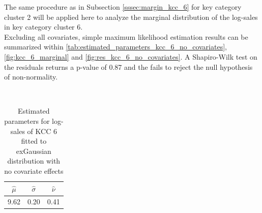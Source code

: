 
The same procedure as in Subsection \ref{sssec:margin_kcc_6} for key category cluster 2 will be applied here to analyze the marginal distribution of the log-sales in key category cluster 6.\\

Excluding all covariates, simple maximum likelihood estimation results can be summarized within \autoref{tab:estimated_parameters_kcc_6_no_covariates}, \autoref{fig:kcc_6_marginal} and \autoref{fig:res_kcc_6_no_covariates}. A Shapiro-Wilk test on the residuals returns a p-value of 0.87 and the fails to reject the null hypothesis of non-normality.
\\



\begin{table}[H]
\setlength\arrayrulewidth{1pt}  
\centering
\begin{adjustbox}{max width=\textwidth}\
\begin{tabular}{|c|c|c|}
\hline
\rowcolor{lightgray} 
$\hat{\mu}$ & $\hat{\sigma}$ & $\hat{\nu}$ \\ \hline
9.62        & 0.20           & 0.41        \\ \hline
\end{tabular}
\end{adjustbox}
\caption{Estimated parameters for log-sales of KCC 6 fitted to exGaussian distribution with no covariate effects}
\label{tab:estimated_parameters_kcc_6_no_covariates}
\end{table}




